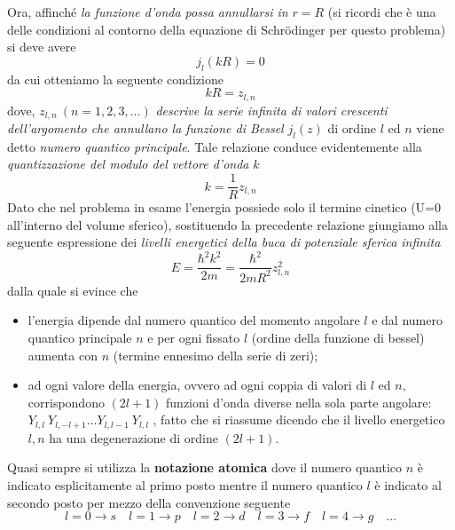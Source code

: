 Ora, affinché \emph{la funzione d’onda possa annullarsi in} $r=R$ (si ricordi che è una delle condizioni al contorno della equazione di Schrödinger per questo problema) si deve avere
\[
j_{l}(kR) = 0
\]
da cui otteniamo la seguente condizione
\[
kR = z_{l,n}
\]
dove, $z_{l,n} \ (n= 1,2,3,\dots)$ \emph{descrive la serie infinita di valori crescenti dell’argomento che annullano la funzione di Bessel} $j_{l}(z)$ di ordine $l$ ed $n$ viene detto \emph{numero quantico principale}. Tale relazione conduce evidentemente alla \emph{quantizzazione del modulo del vettore d’onda} $k$
\[
k = \frac{1}{R} z_{l,n}
\]
Dato che nel problema in esame l’energia possiede solo il termine cinetico (U=0 all’interno del volume sferico), sostituendo la precedente relazione giungiamo alla seguente espressione dei \emph{livelli energetici della buca di potenziale sferica infinita}
\begin{equation}
	E = \frac{\hbar^{2}k^{2}}{2m} = \frac{\hbar^{2}}{2mR^{2}}z_{l,n}^{2}
	\label{eq:energy-levels-infinite-spherical-potential-well}
\end{equation}
dalla quale si evince che
\begin{itemize}
	\item l’energia dipende dal numero quantico del momento angolare $l$ e dal numero quantico principale
	$n$ e per ogni fissato $l$ (ordine della funzione di bessel) aumenta con $n$ (termine ennesimo della serie di zeri);
	\item ad ogni valore della energia, ovvero ad ogni coppia di valori di $l$ ed $n$, corrispondono $(2l+1)$ funzioni d’onda
	diverse nella sola parte angolare: $Y_{l,l} \  Y_{l, -l+1} \dots Y_{l,l-1} \ Y_{l,l}$ , fatto che si riassume dicendo
	che il livello energetico $l, n$ ha una degenerazione di ordine $(2l+1)$.
\end{itemize}

Quasi sempre si utilizza la \textbf{notazione atomica} dove il numero quantico $n$ è indicato esplicitamente al primo posto mentre il numero quantico $l$ è indicato al secondo posto per mezzo della convenzione seguente
\[
l = 0 \to s \quad l = 1 \to p \quad l = 2 \to d \quad l = 3 \to f
\quad l = 4 \to g \quad \dots
\]

